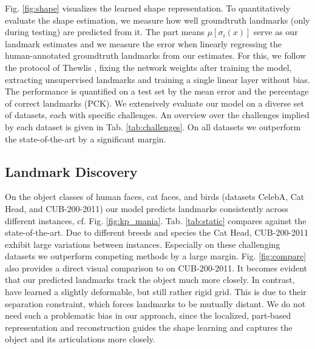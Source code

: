 	Fig. \ref{fig:shape} visualizes the learned shape representation.
	To quantitatively evaluate the shape estimation, we measure how well groundtruth landmarks (only during testing) are predicted from it.
	The part means $\mu[\sigma_i(x)]$  serve as our landmark estimates and we measure the error when linearly regressing the human-annotated groundtruth landmarks from our estimates.
	For this, we follow the protocol of Thewlis \etal \cite{thewlis17}, fixing the network weights after training the model, extracting unsupervised landmarks and training a single linear layer without bias.
	The performance is quantified on a test set by the mean error and the percentage of correct landmarks (PCK).
	We extensively evaluate our model on a diverse set of datasets, each with specific challenges. An overview over the challenges implied by each dataset is given in Tab. \ref{tab:challenges}.
	On all datasets we outperform the state-of-the-art by a significant margin.


	\subsection{Landmark Discovery}
		On the object classes of human faces, cat faces, and birds (datasets CelebA, Cat Head, and CUB-200-2011) our model predicts landmarks consistently across different instances, cf. Fig. \ref{fig:kp_mania}.
		Tab. \ref{tab:static} compares against the state-of-the-art. Due to different breeds and species the Cat Head, CUB-200-2011 exhibit large variations between instances. Especially on these challenging datasets we outperform competing methods by a large margin.
		Fig. \ref{fig:compare} also provides a direct visual comparison to \cite{zhang18} on CUB-200-2011. It becomes evident that our predicted landmarks track the object much more closely. In contrast, \cite{zhang18} have learned a slightly deformable, but still rather rigid grid.
		This is due to their separation constraint, which forces landmarks to be mutually distant. We do not need such a problematic bias in our approach, since the localized, part-based representation and reconstruction guides the shape learning and captures the object and its articulations more closely.

